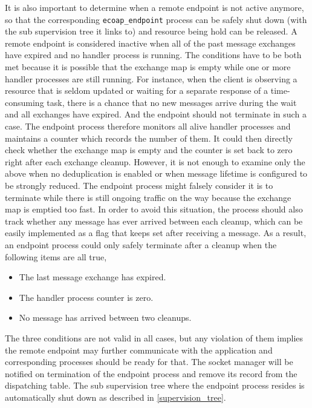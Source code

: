 It is also important to determine when a remote endpoint is not active anymore, so that the corresponding \verb|ecoap_endpoint| process can be safely shut down (with the sub supervision tree it links to) and resource being hold can be released. A remote endpoint is considered inactive when all of the past message exchanges have expired and no handler process is running. The conditions have to be both met because it is possible that the exchange map is empty while one or more handler processes are still running. For instance, when the client is observing a resource that is seldom updated or waiting for a separate response of a time-consuming task, there is a chance that no new messages arrive during the wait and all exchanges have expired. And the endpoint should not terminate in such a case. The endpoint process therefore monitors all alive handler processes and maintains a counter which records the number of them. It could then directly check whether the exchange map is empty and the counter is set back to zero right after each exchange cleanup. However, it is not enough to examine only the above when no deduplication is enabled or when message lifetime is configured to be strongly reduced. The endpoint process might falsely consider it is to terminate while there is still ongoing traffic on the way because the exchange map is emptied too fast. In order to avoid this situation, the process should also track whether any message has ever arrived between each cleanup, which can be easily implemented as a flag that keeps set after receiving a message. As a result, an endpoint process could only safely terminate after a cleanup when the following items are all true,

\begin{itemize}

\item The last message exchange has expired.
\item The handler process counter is zero.
\item No message has arrived between two cleanups. 

\end{itemize}

The three conditions are not valid in all cases, but any violation of them implies the remote endpoint may further communicate with the application and corresponding processes should be ready for that. The socket manager will be notified on termination of the endpoint process and remove its record from the dispatching table. The sub supervision tree where the endpoint process resides is automatically shut down as described in \autoref{supervision_tree}. 

